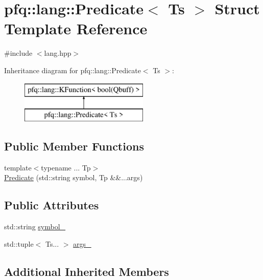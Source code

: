 \hypertarget{structpfq_1_1lang_1_1Predicate}{}\section{pfq\+:\+:lang\+:\+:Predicate$<$ Ts $>$ Struct Template Reference}
\label{structpfq_1_1lang_1_1Predicate}


{\ttfamily \#include $<$lang.\+hpp$>$}

Inheritance diagram for pfq\+:\+:lang\+:\+:Predicate$<$ Ts $>$\+:\begin{figure}[H]
\begin{center}
\leavevmode
\includegraphics[height=2.000000cm]{structpfq_1_1lang_1_1Predicate}
\end{center}
\end{figure}
\subsection*{Public Member Functions}
\begin{DoxyCompactItemize}
\item 
{\footnotesize template$<$typename ... Tp$>$ }\\\hyperlink{structpfq_1_1lang_1_1Predicate_ad604e102c7599051e801d790cca70591}{Predicate} (std\+::string symbol, Tp \&\&...args)
\end{DoxyCompactItemize}
\subsection*{Public Attributes}
\begin{DoxyCompactItemize}
\item 
std\+::string \hyperlink{structpfq_1_1lang_1_1Predicate_a5f3219d34d216f1af9f6b1cafb93cc62}{symbol\+\_\+}
\item 
std\+::tuple$<$ Ts... $>$ \hyperlink{structpfq_1_1lang_1_1Predicate_aee302feb9cdf55566e50249e6dcd50af}{args\+\_\+}
\end{DoxyCompactItemize}
\subsection*{Additional Inherited Members}


